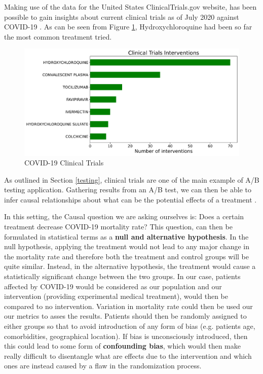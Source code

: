 Making use of the data for the United States ClinicalTrials.gov website, has been possible to gain insights about current clinical trials as of July 2020 against COVID-19 \cite{trials_data}. As can be seen from Figure \ref{trials}, Hydroxychloroquine had been so far the most common treatment tried.
\vspace{-0.2cm}
\begin{figure}[ht!]%
    \centering
    \includegraphics[width=0.65\linewidth]{latex/images/trials.pdf}
    \vspace{-0.2cm}
    \caption{COVID-19 Clinical Trials}
    \label{trials}
\end{figure}
\vspace{-0.2cm}

As outlined in Section \ref{testing}, clinical trials are one of the main example of A/B testing application. Gathering results from an A/B test, we can then be able to infer causal relationships about what can be the potential effects of a treatment \cite{power}.

In this setting, the Causal question we are asking ourselves is: Does a certain treatment decrease COVID-19 mortality rate? This question, can then be formulated in statistical terms as a \textbf{null and alternative hypothesis}. In the null hypothesis, applying the treatment would not lead to any major change in the mortality rate and therefore both the treatment and control groups will be quite similar. Instead, in the alternative hypothesis, the treatment would cause a statistically significant change between the two groups. In our case, patients affected by COVID-19 would be considered as our population and our intervention (providing experimental medical treatment), would then be compared to no intervention. Variation in mortality rate could then be used our our metrics to asses the results. Patients should then be randomly assigned to either groups so that to avoid introduction of any form of bias (e.g. patients age, comorbidities, geographical location). If bias is unconsciously introduced, then this could lead to some form of \textbf{confounding bias}, which would then make really difficult to disentangle what are effects due to the intervention and which ones are instead caused by a flaw in the randomization process. 


